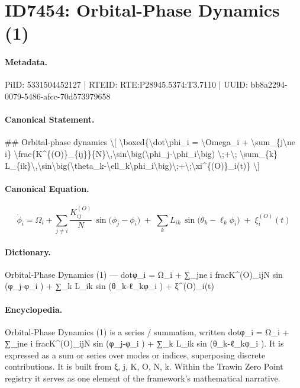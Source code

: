 \section*{ID7454: Orbital-Phase Dynamics (1)}
\paragraph{Metadata.}
PiID: 5331504452127 | RTEID: RTE:P28945.5374:T3.7110 | UUID: bb8a2294-0079-5486-afcc-70d573979658

\paragraph{Canonical Statement.}
\#\# Orbital-phase dynamics \textbackslash{}[ \textbackslash{}boxed\{\textbackslash{}dot\textbackslash{}phi\_i = \textbackslash{}Omega\_i + \textbackslash{}sum\_\{j\textbackslash{}ne i\} \textbackslash{}frac\{K\textasciicircum{}\{(O)\}\_\{ij\}\}\{N\}\textbackslash{},\textbackslash{}sin\textbackslash{}big(\textbackslash{}phi\_j-\textbackslash{}phi\_i\textbackslash{}big) \textbackslash{};+\textbackslash{}; \textbackslash{}sum\_\{k\} L\_\{ik\}\textbackslash{},\textbackslash{}sin\textbackslash{}big(\textbackslash{}theta\_k-\textbackslash{}ell\_k\textbackslash{}phi\_i\textbackslash{}big)\textbackslash{};+\textbackslash{};\textbackslash{}xi\textasciicircum{}\{(O)\}\_i(t)\} \textbackslash{}]

\paragraph{Canonical Equation.}
\[
\boxed{\dot\phi_i = \Omega_i + \sum_{j\ne i} \frac{K^{(O)}_{ij}}{N}\,\sin\big(\phi_j-\phi_i\big) \;+\; \sum_{k} L_{ik}\,\sin\big(\theta_k-\ell_k\phi_i\big)\;+\;\xi^{(O)}_i(t)}
\]

\paragraph{Dictionary.}
Orbital-Phase Dynamics (1) — dotφ\_i = Ω\_i + ∑\_jne i fracK\textasciicircum{}(O)\_ijN sin (φ\_j-φ\_i ) + ∑\_k L\_ik sin (θ\_k-ℓ\_kφ\_i ) + ξ\textasciicircum{}(O)\_i(t)

\paragraph{Encyclopedia.}
Orbital-Phase Dynamics (1) is a series / summation, written dotφ\_i = Ω\_i + ∑\_jne i fracK\textasciicircum{}(O)\_ijN sin (φ\_j-φ\_i ) + ∑\_k L\_ik sin (θ\_k-ℓ\_kφ\_i ). It is expressed as a sum or series over modes or indices, superposing discrete contributions. It is built from ξ, j, K, O, N, k. Within the Trawin Zero Point registry it serves as one element of the framework's mathematical narrative.
